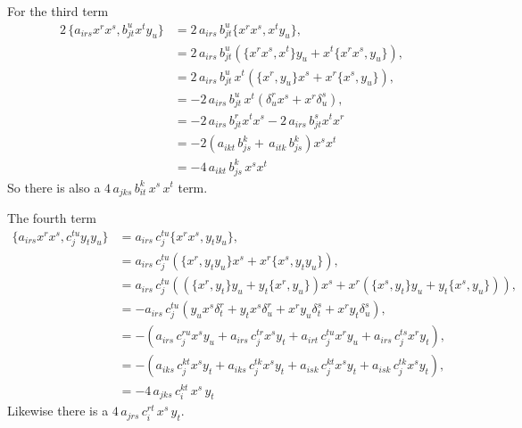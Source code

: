 \documentclass{article}
\begin{document}
    For the third term
    {\color{blue}
    \begin{align*}
        2 \, \{ a_{irs} x^r x^s, b_{jt}^{u} x^t y_u \} &= 2 \,a_{irs}\,  b_{jt}^u \{ x^r x^s, x^t y_u \} ,\\
                                                       &= 2 \,a_{irs}\,  b_{jt}^u  \left( \{  x^r x^s, x^t \} y_u +  x^t \{ x^r x^s , y_u \} \right),\\
                                                       &= 2\, a_{irs} \, b_{jt}^u \, x^t \left( \{ x^r  , y_u \} x^s + x^r \{ x^s, y_u \}  \right),\\
                                                       &= -2\, a_{irs} \, b_{jt}^u \, x^t \left( \delta^{r}_u x^s + x^r \delta^s_u \right),\\
                                                       &= -2 \, a_{irs} \, b_{jt}^r x^t x^s - 2 \, a_{irs} \, b_{jt}^s x^t x^r\\
                                                       &= -2 \left( a_{ikt} \, b_{js}^k  + \, a_{itk} \, b_{js}^k \right) x^s x^t\\
                                                       &= -4 \, a_{ikt} \, b_{js}^k  \, x^s x^t
    \end{align*}}
    So there is also a \( 4 \,a_{jks}\,  b_{it}^k \, x^s \, x^t\) term.

    The fourth term
    {\color{purple}
    \begin{align*}
        \{ a_{irs} x^r x^s, c_{j}^{t u} y_t y_u \} & = a_{irs} \,c_j^{tu} \{ x^r x^s, y_t y_u \},\\
                                                   &= a_{irs}\, c_j^{tu} \left( \{x^r , y_t y_u \} x^s + x^r \{ x^s , y_t y_u \} \right) ,\\
                                                   &= a_{irs}\, c_j^{tu} \left( \left( \{x^r , y_t  \} y_u + y_t \{ x^r, y_u \} \right) x^s + x^r \left( \{ x^s , y_t  \} y_u + y_t \{ x^s , y_u \} \right) \right) ,\\ 
                                                   &= -a_{irs} \, c_j^{tu} \left(    y_u x^s \delta^r_t + y_t x^s \delta^r_u  + x^r y_u \delta^s_t  + x^r y_t \delta^s_u  \right) ,\\ 
                                                   &= - \left( a_{irs} \, c_j^{ru} x^s y_u  +  a_{irs} \, c_j^{tr} x^s y_t +  a_{irt} \, c_j^{tu} x^r y_u   +  a_{irs} \, c_j^{ts} x^r y_t   \right) ,\\
                                                    &= - \left( a_{iks} \, c_j^{kt} x^s y_t  +  a_{iks} \, c_j^{tk}  x^s  y_t  +  a_{isk} \, c_j^{kt} x^s y_t  +  a_{isk} \, c_j^{tk} x^s y_t   \right) ,\\
                                                    &= - 4\, a_{jks}\, c_i^{k t} \,x^s\, y_t
    \end{align*}}
    Likewise there is a \( 4\, a_{jrs}\, c_i^{r t} \,x^s\, y_t\).
    
\end{document}
